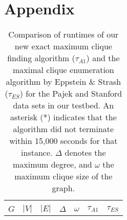 \section*{Appendix}
\label{sec:appendix}

\begin{table}[!hbt]
\centering
\caption{Comparison of runtimes of our new exact maximum clique finding algorithm ($\tau_{A1}$) and the maximal clique enumeration algorithm by Eppstein \& Strash \cite{sea} ($\tau_{ES}$) for the Pajek and Stanford data sets in our testbed. An asterisk (*) indicates that the algorithm did not terminate within 
15,000 seconds for that instance. $\Delta$ denotes the maximum degree, and $\omega$ the maximum clique size of the graph.}
\label{tab:pajek_stanford}
\begin{tabular}{lrrrr|rr}
\toprule\toprule
	&		&		&		&		&		&		\\
$G$	&	$\left|V\right|$	&	$\left|E\right|$	&	$\Delta$	&	$\omega$	&	$\tau_{A1}$	&	$\tau_{ES}$	\\ \hline \hline

\end{tabular}
\end{table}
